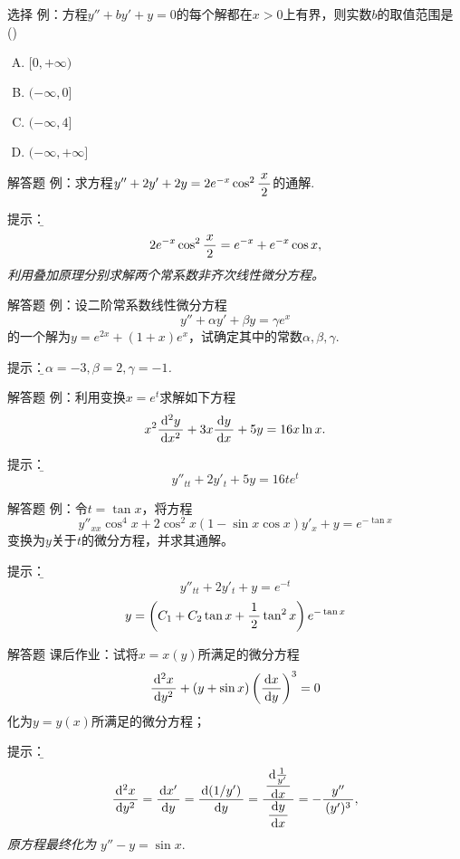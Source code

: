 \begin{frame}{选择}
	\linespread{1.3}
	\alert{例：}方程$y''+by'+y=0$的每个解都在$x>0$上有界，则实数$b$的取值范围是
	(\underline{\;})
	\begin{enumerate}[(A)]
	  \item $[0,+\infty)$
	  \item $(-\infty,0]$
	  \item $(-\infty,4]$
	  \item $(-\infty,+\infty]$
	\end{enumerate}
\end{frame}

\begin{frame}{解答题}
	\linespread{1.2}
	\alert{例：}求方程$y''+2y'+2y=2e^{-x}\cos^2\displaystyle\frac{\,{x}\,}{\,{2}\,}$的通解.
	
	\pause\alert{提示：}\it\b 
	$$2e^{-x}\cos^2\displaystyle\frac{\,{x}\,}{\,{2}\,}=e^{-x}+e^{-x}\cos x,$$
	利用叠加原理分别求解两个常系数非齐次线性微分方程。
\end{frame}

\begin{frame}{解答题}
	\linespread{1.5}
	\alert{例：}设二阶常系数线性微分方程
	$$y''+\alpha y'+\beta y=\gamma e^x$$
	的一个解为$y=e^{2x}+(1+x)e^x$，试确定其中的常数$\alpha,\beta,\gamma$.
	
	\pause\alert{提示：}\it\b $\alpha=-3,\beta=2,\gamma=-1$.
\end{frame}

\begin{frame}{解答题}
	\linespread{1.2}
	\alert{例：}利用变换$x=e^t$求解如下方程
	$$x^2\displaystyle\frac{\,{\mathrm{d}^2y}\,}{\,{\mathrm{d} x^2}\,}+3x\displaystyle\frac{\,{\mathrm{d} y}\,}{\,{\mathrm{d} x}\,}+5y=16x\ln x.$$
	
	\pause\alert{提示：}\it\b 
	$$y''_{tt}+2y'_t+5y=16te^{t}$$
	\pause {}
\end{frame}

\begin{frame}{解答题}
	\linespread{1.2}
	\alert{例：}令$t=\tan x$，将方程
	$$y''_{xx}\cos^4x+2\cos^2x(1-\sin x\cos x)y'_x+y=e^{-\tan x}$$
	变换为$y$关于$t$的微分方程，并求其通解。
	
	\pause\alert{提示：}\it\b 
	$$y''_{tt}+2y'_t+y=e^{-t}$$
	$$y=\left(C_1+C_2\tan x+\displaystyle\frac{\,{1}\,}{\,{2}\,}\tan^2x\right)e^{-\tan x}$$
\end{frame}

\begin{frame}{解答题}
	\linespread{1.2}
	\alert{课后作业：}试将$x=x(y)$所满足的微分方程
    $$\displaystyle\frac{\,{\mathrm{d}^2x}\,}{\,{\mathrm{d} y^2}\,}+(y+\sin x)\left(\displaystyle\frac{\,{\mathrm{d} x}\,}{\,{\mathrm{d} y}\,}\right)^3=0$$
    化为$y=y(x)$所满足的微分方程；
	
	\pause\alert{提示：}\it\b 
	$$\displaystyle\frac{\,{\mathrm{d}^2x}\,}{\,{\mathrm{d} y^2}\,}=\displaystyle\frac{\,{\mathrm{d} x'}\,}{\,{\mathrm{d} y}\,}
	=\displaystyle\frac{\,{\mathrm{d}(1/y')}\,}{\,{\mathrm{d} y}\,}=
	\displaystyle\frac{\,{\displaystyle\frac{\,{\mathrm{d}\frac1{y'}}\,}{\,{\mathrm{d} x}\,}}\,}{\,{\displaystyle\frac{\,{\mathrm{d} y}\,}{\,{\mathrm{d} x}\,}}\,}=-\displaystyle\frac{\,{y''}\,}{\,{(y')^3}\,},$$
	原方程最终化为
	$y''-y=\sin x.$
\end{frame}

